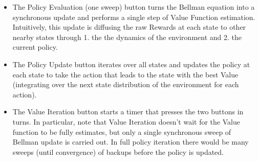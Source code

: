 \documentclass{article}
\begin{document}
\begin{itemize}
	\item The Policy Evaluation (one sweep) button turns the Bellman equation into a synchronous update and performs a single step of Value Function estimation. Intuitively, this update is diffusing the raw Rewards at each state to other nearby states through 1. the the dynamics of the environment and 2. the current policy.
	\item The Policy Update button iterates over all states and updates the policy at each state to take the action that leads to the state with the best Value (integrating over the next state distribution of the environment for each action).
	\item The Value Iteration button starts a timer that presses the two buttons in turns. In particular, note that Value Iteration doesn't wait for the Value function to be fully estimates, but only a single synchronous sweep of Bellman update is carried out. In full policy iteration there would be many sweeps (until convergence) of backups before the policy is updated.
\end{itemize}
\end{document}
